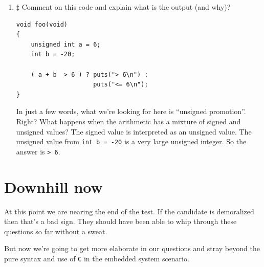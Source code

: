 \documentclass[12pt]{article}
\begin{document}
\begin{enumerate}
Here we're just looking for is the operators {\texttt{|=, \&=, and \~}}.

A candidate who cannot get this answered isn't hired.


\item $\ddagger$ Comment on this code and explain what is the output (and why)?

\begin{lstlisting}
void foo(void)
{
    unsigned int a = 6;
    int b = -20;
    
    ( a + b  > 6 ) ? puts("> 6\n") :
                     puts("<= 6\n");
}
\end{lstlisting}

In just a few words, what we're looking for here is ``unsigned promotion''.
Right?  What happens when the arithmetic has a mixture of signed and
unsigned values?  The signed value is interpreted as an unsigned value.
The unsigned value from {\texttt{int b = -20}} is a very large
unsigned integer.  So the answer is {\texttt{> 6}}.

\end{enumerate}

\section{Downhill now}

At this point we are nearing the end of the test.  If the candidate
is demoralized then that's a bad sign. They should have been able
to whip through these questions so far without a sweat.

But now we're going to get more elaborate in our questions and stray
beyond the pure syntax and use of {\texttt{C}} in the embedded system
scenario.
\end{document}
